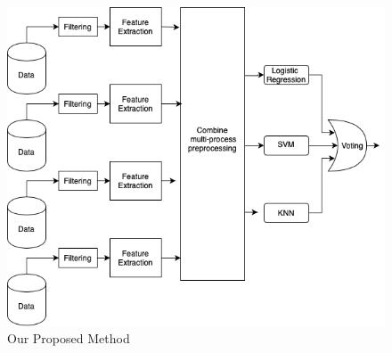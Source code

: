 \begin{figure}[h]
    \centering
    \includegraphics[width=\columnwidth]{tex/figures/model.png}
    \caption{Our Proposed Method}
    \label{fig:model}
\end{figure}
